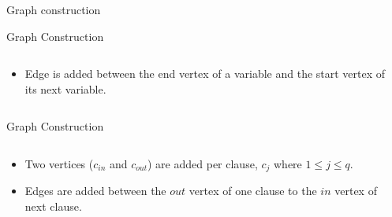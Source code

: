 \documentclass[xcolor=dvipsnames]{beamer}
\begin{document}
\begin{section}{Graph construction }
\begin{frame}{Graph Construction}
\begin{columns}
\begin{column}{0.45\textwidth}
\begin{itemize}
\item<1->Edge is added between the end vertex of a variable and the start vertex of its next variable.
\end{itemize}
\end{column}
\begin{column}{0.55\textwidth}
    \begin{overlayarea}{0.55\textwidth}{8cm}
        
    \end{overlayarea}
\end{column}
\end{columns}
\end{frame}


\begin{frame}{Graph Construction}
\begin{columns}
\begin{column}{0.45\textwidth}
\begin{itemize}
\item<1->Two vertices  ($c_{in}$ and $c_{out}$) are added per clause, $c_j$ where $1 \leq j \leq q$. 
\item<1->Edges are added between the $out$ vertex of one clause to the $in$ vertex of next clause.
\end{itemize}
\end{column}
\begin{column}{0.55\textwidth}
    \begin{overlayarea}{0.55\textwidth}{8cm}
        
    \end{overlayarea}
\end{column}
\end{columns}
\end{frame}


\end{section}
\end{document}
